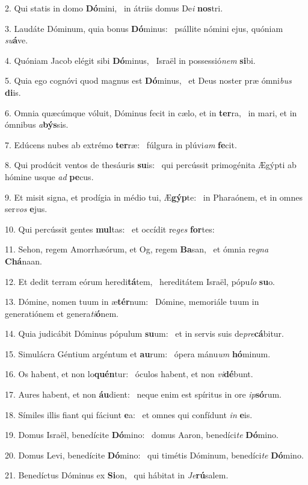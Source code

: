 2. Qui statis in domo \textbf{Dó}mini, \ast\  in átriis domus De\textit{i} \textbf{nos}tri.\

3. Laudáte Dóminum, quia bonus \textbf{Dó}minus: \ast\  psállite nómini ejus, quóniam \textit{su}\textbf{á}ve.\

4. Quóniam Jacob elégit sibi \textbf{Dó}minus, \ast\  Israël in possessió\textit{nem} \textbf{si}bi.\

5. Quia ego cognóvi quod magnus est \textbf{Dó}minus, \ast\  et Deus noster præ ómni\textit{bus} \textbf{di}is.\

6. Omnia quæcúmque vóluit, Dóminus fecit in cælo, et in \textbf{ter}ra, \ast\  in mari, et in ómnibus \textit{a}\textbf{býs}sis.\

7. Edúcens nubes ab extrémo \textbf{ter}ræ: \ast\  fúlgura in plúvi\textit{am} \textbf{fe}cit.\

8. Qui prodúcit ventos de thesáuris \textbf{su}is: \ast\  qui percússit primogénita Ægýpti ab hómine usque \textit{ad} \textbf{pe}cus.\

9. Et misit signa, et prodígia in médio tui, Æ\textbf{gýp}te: \ast\  in Pharaónem, et in omnes ser\textit{vos} \textbf{e}jus.\

10. Qui percússit gentes \textbf{mul}tas: \ast\  et occídit re\textit{ges} \textbf{for}tes:\

11. Sehon, regem Amorrhæórum, et Og, regem \textbf{Ba}san, \ast\  et ómnia re\textit{gna} \textbf{Chá}naan.\

12. Et dedit terram eórum heredi\textbf{tá}tem, \ast\  hereditátem Israël, pópu\textit{lo} \textbf{su}o.\

13. Dómine, nomen tuum in æ\textbf{tér}num: \ast\  Dómine, memoriále tuum in generatiónem et genera\textit{ti}\textbf{ó}nem.\

14. Quia judicábit Dóminus pópulum \textbf{su}um: \ast\  et in servis suis de\textit{pre}\textbf{cá}bitur.\

15. Simulácra Géntium argéntum et \textbf{au}rum: \ast\  ópera mánu\textit{um} \textbf{hó}minum.\

16. Os habent, et non lo\textbf{quén}tur: \ast\  óculos habent, et non \textit{vi}\textbf{dé}bunt.\

17. Aures habent, et non \textbf{áu}dient: \ast\  neque enim est spíritus in ore \textit{ip}\textbf{só}rum.\

18. Símiles illis fiant qui fáciunt \textbf{e}a: \ast\  et omnes qui confídunt \textit{in} \textbf{e}is.\

19. Domus Israël, benedícite \textbf{Dó}mino: \ast\  domus Aaron, benedíci\textit{te} \textbf{Dó}mino.\

20. Domus Levi, benedícite \textbf{Dó}mino: \ast\  qui timétis Dóminum, benedíci\textit{te} \textbf{Dó}mino.\

21. Benedíctus Dóminus ex \textbf{Si}on, \ast\  qui hábitat in \textit{Je}\textbf{rú}salem.\

